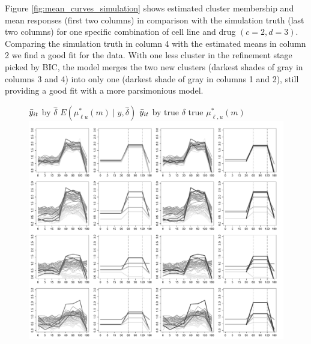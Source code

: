 Figure \ref{fig:mean_curves_simulation} shows estimated cluster membership and
mean responses (first two columns) in comparison with the
simulation truth (last two columns) for one specific combination of cell
line and drug $(c=2,d=3)$.
Comparing the simulation truth in column 4 with the estimated means in
column 2 we find a good fit for the data.
With one less cluster in the refinement stage picked by BIC, the model merges the two new clusters (darkest shades of gray in columns 3 and 4) into only one
(darkest shade of gray in columns 1 and 2), still providing a good fit with a more parsimonious model.


\begin{figure}[tbp]
 \hspace{1.5cm} $\bar{y}_{it}$ by $\hat{\delta}$ \hspace{0.8cm}
  $E(\mu^*_{\ell u}(m) \mid y,\hat{\delta})$     \hspace{.8cm}
  $\bar{y}_{it}$ by true  $\delta$           \hspace{.81cm} 
  true $\mu^*_{\ell,u}(m)$\\
  \includegraphics[scale=0.4]{figs_biometrics/sim_35_scenario1_23.pdf} \\
  

\end{figure}
